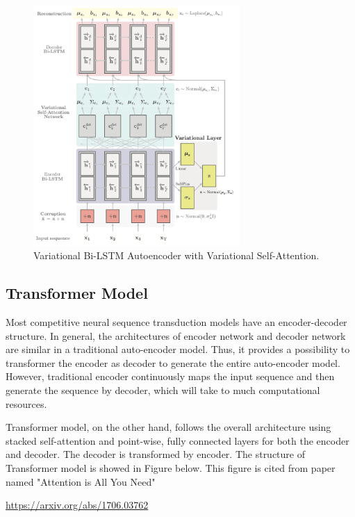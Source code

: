 \documentclass{article}
\begin{document}
\begin{figure}[!t]
    \centering
    \includegraphics[width=0.7\textwidth]{images/BiLSTM.png}
    \caption{Variational Bi-LSTM Autoencoder with Variational Self-Attention.}
\end{figure}


\subsection{Transformer Model}

Most competitive neural sequence transduction models have an encoder-decoder structure. In general, the architectures of encoder network and decoder network are similar in a traditional auto-encoder model. Thus, it provides a possibility to transformer the encoder as decoder to generate the entire auto-encoder model. However, traditional encoder continuously maps the input sequence and then generate the sequence by decoder, which will take to much computational resources.

Transformer model, on the other hand, follows the overall architecture using stacked self-attention and point-wise, fully connected layers for both the encoder and decoder. The decoder is transformed by encoder. The structure of Transformer model is showed in Figure below. This figure is cited from paper named "Attention is All You Need" 

\url{https://arxiv.org/abs/1706.03762}
\end{document}
